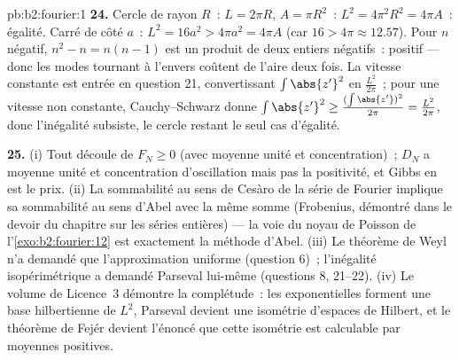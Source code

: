 \begin{solution}{pb:b2:fourier:1}
\textbf{24.} Cercle de rayon $R$~: $L = 2\pi R$, $A = \pi
R^2$~: $L^2 = 4\pi^2R^2 = 4\pi A$~: égalité. Carré de côté
$a$~: $L^2 = 16a^2 > 4\pi a^2 = 4\pi A$ (car $16 > 4\pi \approx
12.57$). Pour $n$ négatif, $n^2 - n = n(n - 1)$ est un produit
de deux entiers négatifs~: positif --- donc les modes tournant à
l'envers coûtent de l'aire deux fois. La vitesse constante est
entrée en question 21, convertissant $\int\abs{z'}^2$ en
$\frac{L^2}{2\pi}$~; pour une vitesse non constante,
Cauchy--Schwarz donne $\int\abs{z'}^2 \geq
\frac{(\int\abs{z'})^2}{2\pi} = \frac{L^2}{2\pi}$, donc
l'inégalité subsiste, le cercle restant le seul cas d'égalité.

\textbf{25.} (i) Tout découle de $F_N \geq 0$ (avec moyenne unité
et concentration)~; $D_N$ a moyenne unité et concentration
d'oscillation mais pas la positivité, et Gibbs en est le prix.
(ii) La sommabilité au sens de Cesàro de la série de Fourier
implique sa sommabilité au sens d'Abel avec la même somme
(Frobenius, démontré dans le devoir du chapitre sur les séries
entières) --- la voie du noyau de Poisson de
l'\cref{exo:b2:fourier:12} est exactement la méthode d'Abel.
(iii) Le théorème de Weyl n'a demandé que l'approximation uniforme
(question 6)~; l'inégalité isopérimétrique a demandé Parseval
lui-même (questions 8, 21--22). (iv) Le volume de Licence~3
démontre la complétude~: les exponentielles forment une base
hilbertienne de $L^2$, Parseval devient une isométrie d'espaces de
Hilbert, et le théorème de Fejér devient l'énoncé que cette
isométrie est calculable par moyennes positives.
\end{solution}
